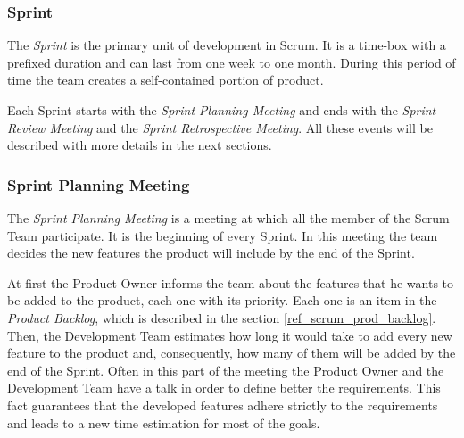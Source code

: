 			
			\subsubsection{Sprint}\label{ref_scrum_sprint}
			The \emph{Sprint} is the primary unit of development in Scrum. It is a time-box with a prefixed duration and can last from one week to one month. During this period of time the team creates a self-contained portion of product. 

			Each Sprint starts with the \emph{Sprint Planning Meeting} and ends with the \emph{Sprint Review Meeting} and the \emph{Sprint Retrospective Meeting}. All these events will be described with more details in the next sections.  
		

			\subsubsection{Sprint Planning Meeting}\label{ref_scrum_sprint_plan}
			The \emph{Sprint Planning Meeting} is a meeting at which all the member of the Scrum Team participate. It is the beginning of every Sprint. In this meeting the team decides the new features the product will include by the end of the Sprint.

			At first the Product Owner informs the team about the features that he wants to be added to the product, each one with its priority. Each one is an item in the \emph{Product Backlog}, which is described in the section \ref{ref_scrum_prod_backlog}. Then, the Development Team estimates how long it would take to add every new feature to the product and, consequently, how many of them will be added by the end of the Sprint. Often in this part of the meeting the Product Owner and the Development Team have a talk in order to define better the requirements. This fact guarantees that the developed features adhere strictly to the requirements and leads to a new time estimation for most of the goals. 

